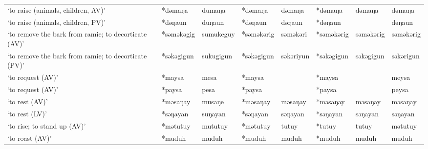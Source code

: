 \begin{landscape}
\begin{longtable}[c]{@{}p{3cm}<{\raggedright}p{2.75cm}<{\raggedright}p{2.75cm}<{\raggedright}p{2.75cm}<{\raggedright}p{2.75cm}<{\raggedright}p{2.75cm}<{\raggedright}p{2.75cm}<{\raggedright}p{2.75cm}<{\raggedright}@{}}
`to raise (animals, children, AV)'                   & *dəmaŋa            & dumaŋa                         & *dəmaŋa            & dəmaŋa                     & *dəmaŋa          & dəmaŋa                   & dəmaŋa                            \\
`to raise (animals, children, PV)'                   & *dəŋaun            & duŋaun                         & *dəŋaun            & dəŋaun                     & *dəŋaun          &                          & dəŋaun                            \\
`to remove the bark from ramie; to decorticate (AV)' & *səməkəgig         & sumukeguy                      & *səməkərig         & səməkəri                   & *səməkərig       & səməkərig                & səməkərig                         \\
`to remove the bark from ramie; to decorticate (PV)' & *səkəgigun         & sukugigun                      & *səkəgigun         & səkəriyun                  & *səkəgigun       & səkəgigun                & səkərigun                         \\
`to request (AV)'                                    & *maysa             & mesa                           & *maysa             &                            & *maysa           &                          & meysa                             \\
`to request (AV)'                                    & *paysa             & pesa                           & *paysa             &                            & *paysa           &                          & peysa                             \\
`to rest (AV)'                                       & *məsaŋay           & musaŋe                         & *məsaŋay           & məsaŋay                    & *məsaŋay         & məsaŋay                  & məsaŋay                           \\
`to rest (LV)'                                       & *səŋayan           & suŋayan                        & *səŋayan           & səŋayan                    & *səŋayan         & səŋayan                  & səŋayan                           \\
`to rise; to stand up (AV)'                          & *mətutuy           & mututuy                        & *mətutuy           & tutuy                      & *tutuy           & tutuy                    & mətutuy                           \\
`to roast (AV)'                                      & *muduh             & muduh                          & *muduh             & muduh                      & *muduh           & muduh                    & muduh                             \\

\end{longtable}
\end{landscape}
